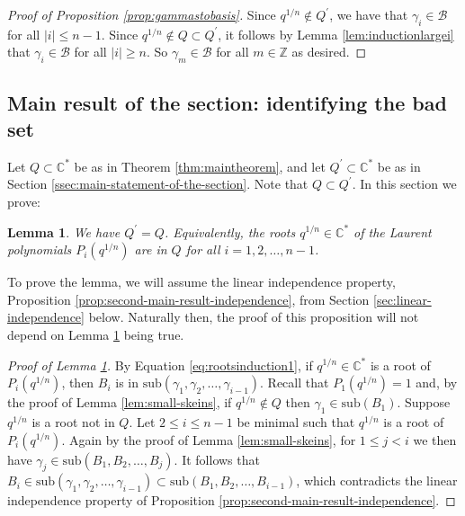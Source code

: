 \documentclass[12pt,
	]{amsart}
\newtheorem{lemma}[theorem]{Lemma}
\theoremstyle{definition}
\newcommand{\mrm}[1]{\mathrm{#1}}
\newcommand{\mbb}[1]{\mathbb{#1}}
\newcommand{\mcal}[1]{\mathcal{#1}}
\newcommand{\lp}{\left(}\newcommand{\rp}{\right)}
\newcommand{\sub}[1]{\mrm{sub}\lp#1\rp}
\newcommand{\Z}{\mbb{Z}}
\newcommand{\C}{\mbb{C}}
\newcommand{\sC}{\C^\ast}
\newcommand{\badset}{Q}
\newcommand{\altbadset}{Q^\prime}
\newcommand{\qroot}{q^{1/n}}
\newcommand{\basgen}{\mcal{B}}
\begin{document}
\begin{proof}[Proof of Proposition {\upshape\ref{prop:gammastobasis}}]
Since $\qroot\notin\altbadset$, we have that $\gamma_i\in\basgen$ for all $|i|\leq n-1$.  Since $\qroot\notin\badset\subset\altbadset$, it follows by Lemma \ref{lem:inductionlargei} that $\gamma_i\in\basgen$ for all $|i|\geq n$.  So $\gamma_m\in\basgen$ for all $m\in\Z$ as desired.  
\end{proof}

\subsection{Main result of the section:  identifying the bad set}\label{ssec:main-result-of-the-section}

Let $\badset\subset\sC$ be as in Theorem \ref{thm:maintheorem}, and let $\altbadset\subset\sC$ be as in Section {\upshape\ref{ssec:main-statement-of-the-section}}.  Note that $\badset\subset\altbadset$.  In this section we prove:

\begin{lemma}\label{lem:twobadsetsarethesame}
We have $\altbadset=\badset$.  Equivalently, the roots $\qroot\in\sC$ of the Laurent polynomials $P_i(\qroot)$ are in $\badset$ for all $i=1,2,\dots,n-1$.
\end{lemma}

To prove the lemma, we will assume the linear independence property, Proposition \ref{prop:second-main-result-independence}, from Section \ref{sec:linear-independence} below.  Naturally then, the proof of this proposition will not depend on Lemma \ref{lem:twobadsetsarethesame} being true.  

\begin{proof}[Proof of Lemma {\upshape\ref{lem:twobadsetsarethesame}}]
By Equation \eqref{eq:rootsinduction1}, if $\qroot\in\sC$ is a root of $P_i(\qroot)$, then $B_i$ is in $\sub{\gamma_1,\gamma_2,\dots,\gamma_{i-1}}$.  Recall that $P_1(\qroot)=1$ and, by the proof of Lemma \ref{lem:small-skeins}, if $\qroot\notin\badset$ then $\gamma_1\in\sub{B_1}$.  Suppose $\qroot$ is a root not in $\badset$.  Let $2\leq i\leq n-1$ be minimal such that $\qroot$ is a root of $P_i(\qroot)$.  Again by the proof of Lemma \ref{lem:small-skeins}, for $1\leq j<i$ we then have $\gamma_j\in\sub{B_1,B_2,\dots,B_j}$.  It follows that $B_i\in\sub{\gamma_1,\gamma_2,\dots,\gamma_{i-1}}\subset\sub{B_1,B_2,\dots,B_{i-1}}$, which contradicts the linear independence property of Proposition \ref{prop:second-main-result-independence}.  
\end{proof}
\end{document}
